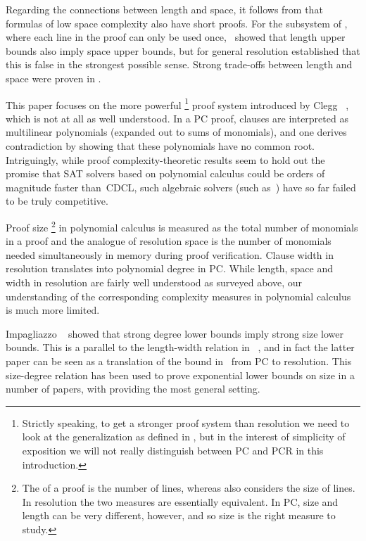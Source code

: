 \documentclass{toc}
\begin{document}
Regarding the connections between length and space,
it follows from
\cite{AD08CombinatoricalCharacterization}
that formulas of low space complexity also have short proofs.
For the subsystem of ,
where each line in the proof can only be used once,
\cite{ET01SpaceBounds}~showed 
%
that length upper bounds also imply space upper bounds,
but for general resolution
\cite{BN08ShortProofs} established that this is false in the
strongest possible sense. 
%
Strong trade-offs between length and space were proven in
\cite{BN11UnderstandingSpace,BBI16TimeSpace}.

This paper focuses on the more powerful
%
%
\footnote{Strictly speaking, to get a stronger proof system than
  resolution we need to look at the generalization
%
%
  as defined in
  \cite{ABRW02SpaceComplexity},
%
%
  but in the interest of simplicity of exposition we will not really
  distinguish between PC and PCR in this introduction.
}
proof system introduced by Clegg \etal~\cite{CEI96Groebner},
which is not at all as well understood.
In a PC proof, clauses are interpreted as multilinear polynomials
(expanded out to sums of monomials),
and one derives contradiction by showing that these polynomials have
no common root. 
%
Intriguingly, while proof complexity-theoretic results seem to hold
out the promise that SAT solvers based on 
%
%
polynomial calculus could be orders of
magnitude faster than~CDCL, such algebraic solvers 
%
(such as~\cite{BD09Polybori})
have so far failed to be truly competitive.

Proof size%
\footnote{The  of a proof is the
  number of lines, whereas  also   considers 
  the size of lines. In resolution the two measures are
  essentially equivalent. In PC, %
  size and length can be
  very different, however, and so size is the right measure to study.}
in 
%
polynomial calculus   
is measured as the total number of monomials in a proof
and the analogue of resolution space is the number of monomials needed 
%
simultaneously in memory during
proof verification. Clause width in resolution
translates into polynomial degree in PC.
While length, space and width in resolution are fairly well
understood as surveyed above,
our understanding of the corresponding
complexity measures in 
%
polynomial calculus is much more limited.

Impagliazzo \etal~\cite{IPS99LowerBounds}
showed that strong degree lower bounds imply strong size lower bounds.
This is a parallel to the length-width relation 
%
in~%
\cite{BW01ShortProofs},
and in fact the latter paper can be seen as a 
translation of   the bound in~%
\cite{IPS99LowerBounds} from
PC 
%
to resolution.
This size-degree relation has been used to prove exponential lower
bounds on  size in a number of papers, with
%
\cite{AR03LowerBounds,MN15GeneralizedMethodDegree}
%
providing the most general setting.
\end{document}
